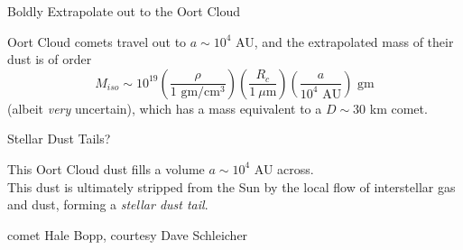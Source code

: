 \documentclass[20pt,35mmSlide,landscape]{foils}
\begin{document}
\newpage
\pagecolor{light-yellow}
\normalsize

\vspace*{-1.0in}\begin{center}
{\large Boldly Extrapolate out to the Oort Cloud\vspace*{2ex}}
\end{center}
\noindent Oort Cloud comets travel out to $a\sim10^4$ AU, and
the extrapolated mass of their dust is of order
\begin{displaymath}
M_{iso}\sim10^{19}\left(\frac{\rho}{\mbox{1 gm/cm$^3$}}\right)
\left(\frac{R_c}{1\ \mu\mbox{m}}\right)
\left(\frac{a}{10^4\mbox{ AU}}\right)\mbox{ gm}
\end{displaymath}
(albeit {\sl very} uncertain),
which has a mass equivalent to a $D\sim30$ km comet.


\newpage
\pagecolor{light-yellow}
\normalsize

\parbox[t]{10in}{
\vspace*{-0in}\parbox{4.75in}{
\begin{center}
{\large Stellar Dust Tails?\vspace*{2ex}}
\end{center}

This Oort Cloud dust fills a volume $a\sim10^4$ AU across.\\

This dust is ultimately stripped from the Sun by the local
flow of interstellar gas and dust, forming a
{\sl stellar dust tail}.\vspace*{2in}
}
\hfil\vspace*{-2in}\parbox[h]{5.0in}{
\vspace*{-1in}\begin{figure}
\end{figure}
\begin{center}
{\tiny comet Hale Bopp, courtesy Dave Schleicher}
\end{center}
}
}

\pagecolor{light-yellow}
\normalsize
\end{document}
